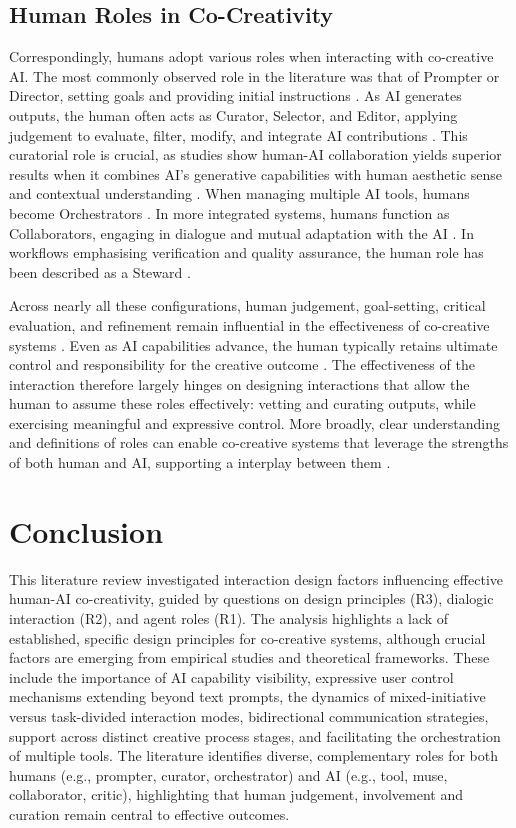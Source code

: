 \subsection{Human Roles in Co-Creativity}
Correspondingly, humans adopt various roles when interacting with co-creative AI. The most commonly observed role in the literature was that of Prompter or Director, setting goals and providing initial instructions \cite{Oh2018-mu, Wan2023-he}. As AI generates outputs, the human often acts as Curator, Selector, and Editor, applying judgement to evaluate, filter, modify, and integrate AI contributions \cite{Hitsuwari2023-tw, Wu2025-or, Huang2020-fh}. This curatorial role is crucial, as studies show human-AI collaboration yields superior results when it combines AI's generative capabilities with human aesthetic sense and contextual understanding \cite{Hitsuwari2023-tw, Wu2025-or}. When managing multiple AI tools, humans become Orchestrators \cite{Palani2024-on}. In more integrated systems, humans function as Collaborators, engaging in dialogue and mutual adaptation with the AI \cite{Lawton2023-tb, Wan2023-he}. In workflows emphasising verification and quality assurance, the human role has been described as a Steward \cite{Lee2025-dw}.

Across nearly all these configurations, human judgement, goal-setting, critical evaluation, and refinement remain influential in the effectiveness of co-creative systems \cite{Li2024-yh, Hitsuwari2023-tw, Sarkar2023-ee}. Even as AI capabilities advance, the human typically retains ultimate control and responsibility for the creative outcome \cite{Shneiderman2020-ue, Li2024-yh}. The effectiveness of the interaction therefore largely hinges on designing interactions that allow the human to assume these roles effectively: vetting and curating outputs, while exercising meaningful and expressive control. More broadly, clear understanding and definitions of roles can enable co-creative systems that leverage the strengths of both human and AI, supporting a interplay between them \cite{Guzdial2019-cv, Moruzzi2024-cq, Weisz2024-io}.

\section{Conclusion}

This literature review investigated interaction design factors influencing effective human-AI co-creativity, guided by questions on design principles (R3), dialogic interaction (R2), and agent roles (R1). The analysis highlights a lack of established, specific design principles for co-creative systems, although crucial factors are emerging from empirical studies and theoretical frameworks. These include the importance of AI capability visibility, expressive user control mechanisms extending beyond text prompts, the dynamics of mixed-initiative versus task-divided interaction modes, bidirectional communication strategies, support across distinct creative process stages, and facilitating the orchestration of multiple tools. The literature identifies diverse, complementary roles for both humans (e.g., prompter, curator, orchestrator) and AI (e.g., tool, muse, collaborator, critic), highlighting that human judgement, involvement and curation remain central to effective outcomes. 
